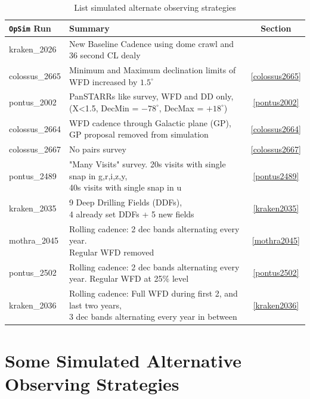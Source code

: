 \documentclass[DM,lsstdraft,authoryear,toc]{lsstdoc}
\newcommand{\opsim}{\texttt{OpSim}\xspace}
\begin{document}
\begin{table}[htp]
\caption{List simulated alternate observing strategies}
\begin{center}
\footnotesize
\begin{tabular}{| l | l | c |}
\toprule
\opsim Run & Summary  & Section \\
\midrule
kraken\_2026      & New Baseline Cadence using dome crawl and 36 second CL dealy & \\
\midrule
colossus\_2665   & Minimum and Maximum declination limits of WFD increased by $1.5^{\circ}$ & \ref{colossus2665} \\
\midrule
pontus\_2002      & PanSTARRs like survey, WFD and DD only, (X<1.5, DecMin = $-78^{\circ}$, DecMax = $+18^{\circ}$) & \ref{pontus2002}  \\  
\midrule
colossus\_2664   & WFD cadence through Galactic plane (GP), GP proposal removed from simulation & \ref{colossus2664} \\
\midrule
colossus\_2667   & No pairs survey &  \ref{colossus2667} \\
\midrule
pontus\_2489      & \makecell{"Many Visits" survey. 20s visits with single snap in g,r,i,z,y, \\ 40s visits with single snap in u}  &  \ref{pontus2489} \\
\midrule
kraken\_2035      &\makecell{ 9 Deep Drilling Fields (DDFs), \\ 4 already set DDFs + 5 new fields} &  \ref{kraken2035} \\
\midrule
mothra\_2045      & \makecell{Rolling cadence: 2 dec bands alternating every year. \\ Regular WFD removed} & \ref {mothra2045} \\
\midrule
pontus\_2502      &  \makecell{Rolling cadence: 2 dec bands alternating every year.  \\ Regular WFD at 25$\%$ level} & \ref {pontus2502} \\
\midrule
kraken\_2036      & \makecell{ Rolling cadence: Full WFD during first 2, and last two years, \\ 3 dec bands alternating every year in between} & \ref {kraken2036} \\
\bottomrule
\end{tabular}
\end{center}
\label{tab:runlist}
\end{table}

\section{Some Simulated Alternative Observing Strategies}
\end{document}
